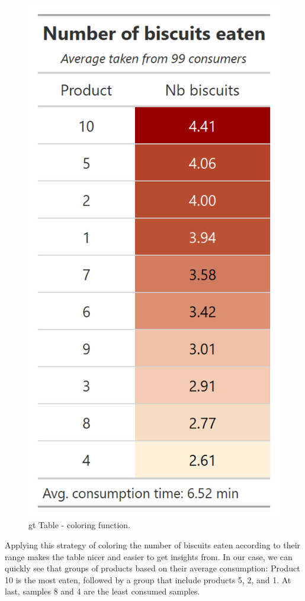 \documentclass[
]{krantz}
\begin{document}
\begin{figure}

{\centering \includegraphics[width=0.9\linewidth]{images/gt_table_2} 

}

\caption{gt Table - coloring function.}\label{fig:gttabledesigned}
\end{figure}

Applying this strategy of coloring the number of biscuits eaten according to their range makes the table nicer and easier to get insights from. In our case, we can quickly see that groups of products based on their average consumption: Product 10 is the most eaten, followed by a group that include products 5, 2, and 1. At last, samples 8 and 4 are the least consumed samples.
\end{document}
